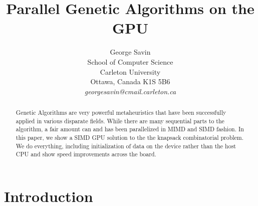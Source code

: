 \documentclass[11pt]{article}       %
\begin{document}


\title{Parallel Genetic Algorithms on the GPU}


\author{
George Savin\\
School of Computer Science\\
Carleton University\\
Ottawa, Canada K1S 5B6\\
{\em georgesavin@cmail.carleton.ca}
} %

\maketitle

\begin{abstract}
Genetic Algorithms are very powerful metaheuristics that have been successfully applied in 
various disparate fields. While there are many sequential parts to the algorithm, a fair amount
can and has been parallelized in MIMD and SIMD fashion. In this paper, we show a SIMD GPU solution to the the knapsack combinatorial problem. We do everything, including initialization of data on the device rather than the host CPU and show speed improvements across the board.
\end{abstract}

\section{Introduction} \label{intro}
\end{document}
